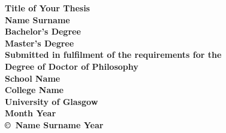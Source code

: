\documentclass[12pt,oneside]{book} %
\begin{document}
\begin{titlepage}
\centering
\vspace*{3cm}  %
\bfseries\Large
Title of Your Thesis\\
\vspace{3cm}
\normalfont\large
Name Surname\\
Bachelor's Degree\\
Master's Degree\\
\vspace{2cm}
Submitted in fulfilment of the requirements for the\\
Degree of Doctor of Philosophy\\
\vspace{2cm}
School Name\\
College Name\\
University of Glasgow\\
\vspace{2cm}
Month Year\\
\vspace{2cm}
\copyright\ Name Surname Year
\end{titlepage}


\frontmatter  %

\tableofcontents
\listoffigures

\mainmatter %




% 

\appendix

\printbibliography[heading=bibintoc, title=Bibliography]
\end{document}
